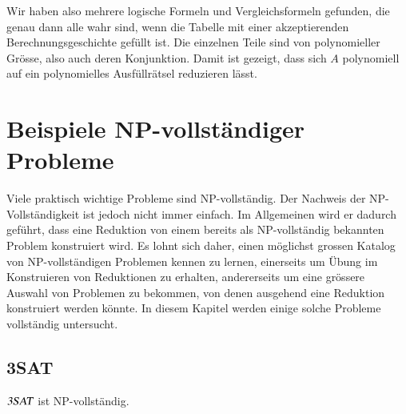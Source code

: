 Wir haben also mehrere logische Formeln und Vergleichsformeln
gefunden, die genau dann alle wahr sind, wenn die Tabelle mit einer
akzeptierenden Berechnungsgeschichte gefüllt ist.
Die einzelnen Teile sind von polynomieller Grösse, also auch deren
Konjunktion.
Damit ist gezeigt, dass sich $A$ polynomiell auf ein polynomielles
Ausfüllrätsel reduzieren lässt.


\section{Beispiele NP-vollständiger Probleme}
Viele praktisch wichtige Probleme sind NP-vollständig. Der Nachweis
der NP-Vollständigkeit ist jedoch nicht immer einfach. Im Allgemeinen
wird er dadurch geführt, dass eine Reduktion von einem bereits als
NP-vollständig bekannten Problem konstruiert wird. Es lohnt sich
daher, einen möglichst grossen Katalog von NP-vollständigen
Problemen kennen zu lernen, einerseits um Übung im Konstruieren
von Reduktionen zu erhalten, andererseits um eine grössere Auswahl 
von Problemen zu bekommen, von denen ausgehend eine Reduktion 
konstruiert werden könnte. In diesem Kapitel werden einige
solche Probleme vollständig untersucht.
\subsection{3SAT}
\begin{satz}
$\text{\textsl{3SAT}}$ ist NP-vollständig.
\end{satz}

